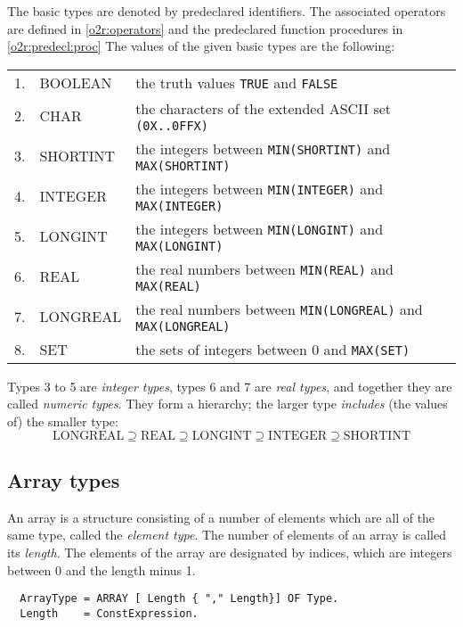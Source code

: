 The basic types are denoted by predeclared identifiers. The associated
operators are defined in \ref{o2r:operators} and the predeclared
function procedures in \ref{o2r:predecl:proc} The values
of the given basic types are the following:
\begin{flushleft}
\begin{tabular}{llp{7cm}}
1. & { BOOLEAN}  &   the truth values {\tt TRUE} and {\tt FALSE}               \\
2. & { CHAR}     &   the characters of the extended ASCII set
                                                     {\tt (0X..0FFX)}    \\
3. & { SHORTINT} &   the integers between {\tt MIN(SHORTINT)}
                                      and {\tt MAX(SHORTINT)}     \\
4. & { INTEGER}  &   the integers between {\tt MIN(INTEGER)}
                                                and {\tt MAX(INTEGER)}      \\
5. & { LONGINT}  &   the integers between {\tt MIN(LONGINT)}
                                                and {\tt MAX(LONGINT)}      \\
6. & { REAL}     &   the real numbers between {\tt MIN(REAL)}
                                                and {\tt MAX(REAL)}         \\
7. & { LONGREAL} &   the real numbers between {\tt MIN(LONGREAL)}
                                                and {\tt MAX(LONGREAL)}     \\
8. & { SET}      &   the sets of integers between 0 and {\tt MAX(SET)}   \\
\end{tabular}
\end{flushleft}
Types 3 to 5 are {\em integer types}, types 6 and 7 are {\em real
types}, and together they are called {\em numeric types}. They
form a hierarchy; the larger type {\em includes} (the values of)
the smaller type:
$$
\mbox{LONGREAL} \supseteq
\mbox{REAL} \supseteq
\mbox{LONGINT} \supseteq
\mbox{INTEGER} \supseteq
\mbox{SHORTINT}
$$

\subsection{Array types}

An array is a structure consisting of a number of elements which are
all of the same type, called the {\em element type}. The number of
elements of an array is called its {\em length}. The elements of
the array are designated by indices, which are integers between 0
and the length minus 1.
{\BNFsize
\begin{verbatim}
  ArrayType = ARRAY [ Length { "," Length}] OF Type.
  Length    = ConstExpression.
\end{verbatim}}

